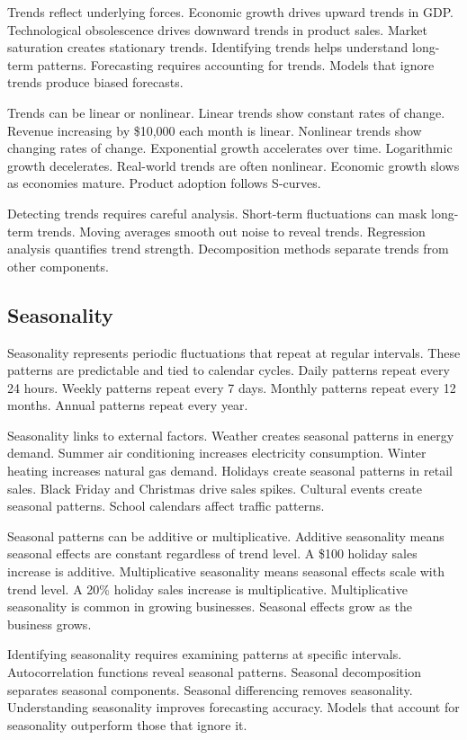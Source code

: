 Trends reflect underlying forces. Economic growth drives upward trends in GDP. Technological obsolescence drives downward trends in product sales. Market saturation creates stationary trends. Identifying trends helps understand long-term patterns. Forecasting requires accounting for trends. Models that ignore trends produce biased forecasts.

Trends can be linear or nonlinear. Linear trends show constant rates of change. Revenue increasing by \$10,000 each month is linear. Nonlinear trends show changing rates of change. Exponential growth accelerates over time. Logarithmic growth decelerates. Real-world trends are often nonlinear. Economic growth slows as economies mature. Product adoption follows S-curves.

Detecting trends requires careful analysis. Short-term fluctuations can mask long-term trends. Moving averages smooth out noise to reveal trends. Regression analysis quantifies trend strength. Decomposition methods separate trends from other components.

\subsection{Seasonality}

Seasonality represents periodic fluctuations that repeat at regular intervals. These patterns are predictable and tied to calendar cycles. Daily patterns repeat every 24 hours. Weekly patterns repeat every 7 days. Monthly patterns repeat every 12 months. Annual patterns repeat every year.

Seasonality links to external factors. Weather creates seasonal patterns in energy demand. Summer air conditioning increases electricity consumption. Winter heating increases natural gas demand. Holidays create seasonal patterns in retail sales. Black Friday and Christmas drive sales spikes. Cultural events create seasonal patterns. School calendars affect traffic patterns.

Seasonal patterns can be additive or multiplicative. Additive seasonality means seasonal effects are constant regardless of trend level. A \$100 holiday sales increase is additive. Multiplicative seasonality means seasonal effects scale with trend level. A 20\% holiday sales increase is multiplicative. Multiplicative seasonality is common in growing businesses. Seasonal effects grow as the business grows.

Identifying seasonality requires examining patterns at specific intervals. Autocorrelation functions reveal seasonal patterns. Seasonal decomposition separates seasonal components. Seasonal differencing removes seasonality. Understanding seasonality improves forecasting accuracy. Models that account for seasonality outperform those that ignore it.

